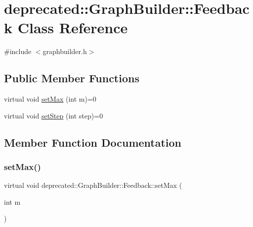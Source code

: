 \hypertarget{classdeprecated_1_1_graph_builder_1_1_feedback}{}\section{deprecated\+::Graph\+Builder\+::Feedback Class Reference}
\label{classdeprecated_1_1_graph_builder_1_1_feedback}


{\ttfamily \#include $<$graphbuilder.\+h$>$}

\subsection*{Public Member Functions}
\begin{DoxyCompactItemize}
\item 
virtual void \mbox{\hyperlink{classdeprecated_1_1_graph_builder_1_1_feedback_adec54a3ce38b2a26378549ccbf9b51f3}{set\+Max}} (int m)=0
\item 
virtual void \mbox{\hyperlink{classdeprecated_1_1_graph_builder_1_1_feedback_a15c57dc413f0aa6e71deaf006091573b}{set\+Step}} (int step)=0
\end{DoxyCompactItemize}


\subsection{Member Function Documentation}
\mbox{\label{classdeprecated_1_1_graph_builder_1_1_feedback_adec54a3ce38b2a26378549ccbf9b51f3}} 
\subsubsection{\texorpdfstring{setMax()}{setMax()}}
{\footnotesize\ttfamily virtual void deprecated\+::\+Graph\+Builder\+::\+Feedback\+::set\+Max (\begin{DoxyParamCaption}\item[{int}]{m }\end{DoxyParamCaption})\hspace{0.3cm}{\ttfamily [pure virtual]}}

\mbox{\label{classdeprecated_1_1_graph_builder_1_1_feedback_a15c57dc413f0aa6e71deaf006091573b}} 
